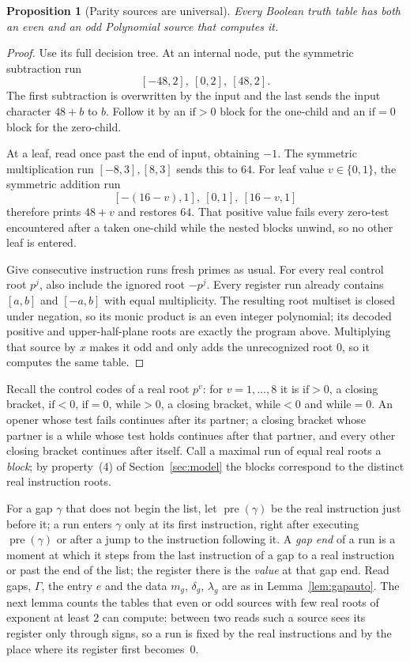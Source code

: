 \documentclass[11pt]{article}
\newtheorem{proposition}[theorem]{Proposition}
\theoremstyle{remark}
\begin{document}
\begin{proposition}[Parity sources are universal]\label{prop:evenuniversal}
Every Boolean truth table has both an even and an odd Polynomial source
that computes it.
\end{proposition}

\begin{proof}
Use its full decision tree.  At an internal node, put the symmetric
subtraction run
\[
 [-48,2],\ [0,2],\ [48,2].
\]
The first subtraction is overwritten by the input and the last sends the
input character $48+b$ to $b$.  Follow it by an
$\text{if}>0$ block for the one-child and an $\text{if}=0$ block for the
zero-child.

At a leaf, read once past the end of input, obtaining $-1$.  The symmetric
multiplication run $[-8,3],[8,3]$ sends this to $64$.  For leaf value
$v\in\{0,1\}$, the symmetric addition run
\[
 [-(16-v),1],\ [0,1],\ [16-v,1]
\]
therefore prints $48+v$ and restores $64$.  That positive value fails every
zero-test encountered after a taken one-child while the nested blocks
unwind, so no other leaf is entered.

Give consecutive instruction runs fresh primes as usual.  For every real
control root $p^j$, also include the ignored root $-p^j$.  Every register
run already contains $[a,b]$ and $[-a,b]$ with equal multiplicity.  The
resulting root multiset is closed under negation, so its monic product is an
even integer polynomial; its decoded positive and upper-half-plane roots
are exactly the program above.  Multiplying that source by $x$ makes it odd
and only adds the unrecognized root $0$, so it computes the same table.
\end{proof}

Recall the control codes of a real root $p^v$: for $v=1,\dots,8$ it is $\text{if}>0$, a
closing bracket, $\text{if}<0$, $\text{if}=0$, $\text{while}>0$, a closing bracket,
$\text{while}<0$ and $\text{while}=0$.  An opener whose test fails continues after its
partner; a closing bracket whose partner is a $\text{while}$ whose test holds continues
after that partner, and every other closing bracket continues after itself.  Call a
maximal run of equal real roots a \emph{block}; by property~(4) of
Section~\ref{sec:model} the blocks correspond to the distinct real instruction roots.

For a gap $\gamma$ that does not begin the list, let $\operatorname{pre}(\gamma)$ be the
real instruction just before it; a run enters $\gamma$ only at its first instruction,
right after executing $\operatorname{pre}(\gamma)$ or after a jump to the instruction
following it.  A \emph{gap end} of a run is a moment at which it steps from the last
instruction of a gap to a real instruction or past the end of the list; the register
there is the \emph{value} at that gap end.  Read gaps, $\Gamma$, the entry $e$ and the
data $m_g$, $\delta_g$, $\lambda_g$ are as in Lemma~\ref{lem:gapauto}.  The next lemma
counts the tables that even or odd sources with few real roots of exponent at least $2$
can compute: between two reads such a source sees its register only through signs, so a
run is fixed by the real instructions and by the place where its register first
becomes~$0$.
\end{document}
